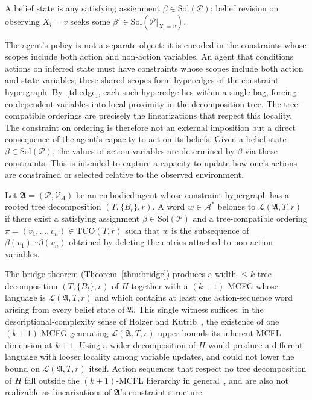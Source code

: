 \documentclass[runningheads]{llncs}
\begin{document}
A belief state is any satisfying assignment $\beta \in \mathrm{Sol}(\mathcal{P})$; belief revision on observing $X_i = v$ seeks some $\beta' \in \mathrm{Sol}(\mathcal{P}|_{X_i = v})$.

\begin{remark}\label{rem:policy}
The agent's policy is not a separate object: it is encoded in the constraints whose scopes include both action and non-action variables. An agent that conditions actions on inferred state must have constraints whose scopes include both action and state variables; these shared scopes form hyperedges of the constraint hypergraph. By~\ref{td:edge}, each such hyperedge lies within a single bag, forcing co-dependent variables into local proximity in the decomposition tree. The tree-compatible orderings are precisely the linearizations that respect this locality. The constraint on ordering is therefore not an external imposition but a direct consequence of the agent's capacity to act on its beliefs. Given a belief state $\beta \in \mathrm{Sol}(\mathcal{P})$, the values of action variables are determined by $\beta$ via these constraints. This is intended to capture a capacity to update how one's actions are constrained or selected relative to the observed environment.
\end{remark}

\begin{definition}\label{def:behavior-language}
Let $\mathfrak{A} = (\mathcal{P}, \mathcal{V}_A)$ be an embodied agent whose constraint hypergraph has a rooted tree decomposition $(T, \{B_t\}, r)$. A word $w \in \mathcal{A}^*$ belongs to $\mathcal{L}(\mathfrak{A}, T, r)$ if there exist a satisfying assignment $\beta \in \mathrm{Sol}(\mathcal{P})$ and a tree-compatible ordering $\pi = (v_1, \ldots, v_n) \in \mathrm{TCO}(T, r)$ such that $w$ is the subsequence of $\beta(v_1)\cdots\beta(v_n)$ obtained by deleting the entries attached to non-action variables.
\end{definition}

\begin{remark}\label{rem:witness}
The bridge theorem (Theorem~\ref{thm:bridge}) produces a width-$\leq k$ tree decomposition $(T, \{B_t\}, r)$ of $H$ together with a $(k{+}1)$-MCFG whose language is $\mathcal{L}(\mathfrak{A}, T, r)$ and which contains at least one action-sequence word arising from every belief state of $\mathfrak{A}$. This single witness suffices: in the descriptional-complexity sense of Holzer and Kutrib~\cite{HolzerKutrib11}, the existence of one $(k{+}1)$-MCFG generating $\mathcal{L}(\mathfrak{A}, T, r)$ upper-bounds its inherent MCFL dimension at $k{+}1$. Using a wider decomposition of $H$ would produce a different language with looser locality among variable updates, and could not lower the bound on $\mathcal{L}(\mathfrak{A}, T, r)$ itself. Action sequences that respect no tree decomposition of $H$ fall outside the $(k{+}1)$-MCFL hierarchy in general~\cite{Seki91}, and are also not realizable as linearizations of $\mathfrak{A}$'s constraint structure.
\end{remark}
\end{document}
